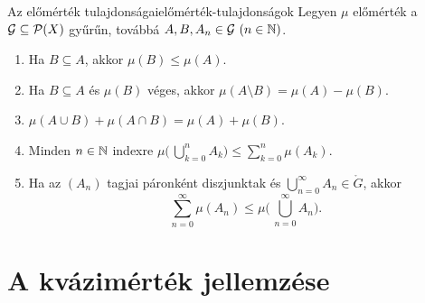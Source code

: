 \documentclass[
]{elteikthesis}[2024/04/26]
\begin{document}
	\begin{theorem}{Az előmérték tulajdonságai}{előmérték-tulajdonságok}
		Legyen \( \mu \) előmérték a \( \mathcal{G} \subseteq \mathcal{P}( X ) \) gyűrűn,
		továbbá \( A, B, A_n \in \mathcal{G} \ (n \in \mathbb{N}) \).
		
		\begin{enumerate}[label=\arabic*.]
			\item\label{th:előmérték-monoton}
			Ha \( B \subseteq A \), akkor \( \mu(B) \leq \mu(A) \).
			
			\item\label{th:előmérték-különbség-mértéke}
			Ha \( B \subseteq A \) és  \( \mu(B) \) véges,
			akkor \( \mu(A \setminus B) = \mu(A) - \mu(B) \).
			
			\item\label{th:előmérték-szita-formula}
			\( \mu(A \cup B) + \mu(A \cap B) = \mu(A) + \mu(B) \).
			
			\item\label{th:előmérték-véges-szubadditív}
			Minden \( n \in \mathbb{N} \) indexre 
			\( \mu \biggl(\, \bigcup\limits_{k=0}^n \! A_k \biggr) \leq \sum\limits_{k=0}^n \mu( A_k ) \).
			
			\item\label{th:előmérték-szubadditívitás-kiterjesztése}
			Ha az \( (A_n) \) tagjai páronként diszjunktak
			és \( \bigcup\limits_{n=0}^{\infty} \! A_n \in \ring{G} \), akkor
			\[
			\sum\limits_{n=0}^{\infty} \mu( A_n ) \leq
			\mu \Biggl(\, \bigcup\limits_{n=0}^{\infty} \! A_n \Biggr).
			\]
		\end{enumerate}
	\end{theorem}
	
	\newpage
	
	\section{A kvázimérték jellemzése}
	\,\vspace{-\baselineskip}
	
\end{document}
